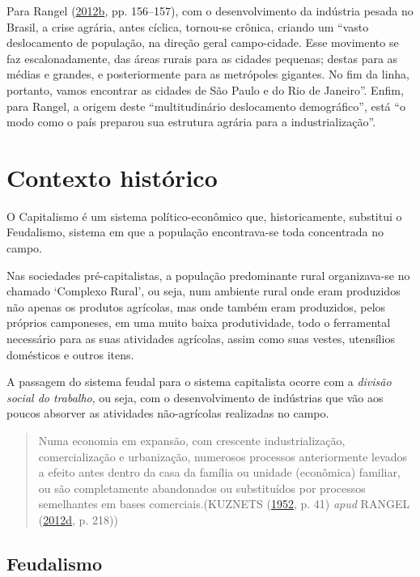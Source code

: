 \documentclass[a4paper, 12pt]{article}
\begin{document}
Para Rangel
(\protect\hyperlink{ref-rangel1988}{2012}\protect\hyperlink{ref-rangel1988}{b},
pp. 156--157), com o desenvolvimento da indústria pesada no Brasil, a
crise agrária, antes cíclica, tornou-se crônica, criando um ``vasto
deslocamento de população, na direção geral campo-cidade. Esse movimento
se faz escalonadamente, das áreas rurais para as cidades pequenas;
destas para as médias e grandes, e posteriormente para as metrópoles
gigantes. No fim da linha, portanto, vamos encontrar as cidades de São
Paulo e do Rio de Janeiro''. Enfim, para Rangel, a origem deste
``multitudinário deslocamento demográfico'', está ``o modo como o país
preparou sua estrutura agrária para a industrialização''.

\hypertarget{contexto-historico}{%
\section{Contexto histórico}\label{contexto-historico}}

O Capitalismo é um sistema político-econômico que, historicamente,
substitui o Feudalismo, sistema em que a população encontrava-se toda
concentrada no campo.

Nas sociedades pré-capitalistas, a população predominante rural
organizava-se no chamado `Complexo Rural', ou seja, num ambiente rural
onde eram produzidos não apenas os produtos agrícolas, mas onde também
eram produzidos, pelos próprios camponeses, em uma muito baixa
produtividade, todo o ferramental necessário para as suas atividades
agrícolas, assim como suas vestes, utensílios domésticos e outros itens.

A passagem do sistema feudal para o sistema capitalista ocorre com a
\emph{divisão social do trabalho}, ou seja, com o desenvolvimento de
indústrias que vão aos poucos absorver as atividades não-agrícolas
realizadas no campo.

\begin{quote}
Numa economia em expansão, com crescente industrialização,
comercialização e urbanização, numerosos processos anteriormente levados
a efeito antes dentro da casa da família ou unidade (econômica)
familiar, ou são completamente abandonados ou substituídos por processos
semelhantes em bases comerciais.(KUZNETS
(\protect\hyperlink{ref-kuznets}{1952}, p. 41) \emph{apud} RANGEL
(\protect\hyperlink{ref-rangel1956}{2012}\protect\hyperlink{ref-rangel1956}{d},
p. 218))
\end{quote}

\hypertarget{feudalismo}{%
\subsection{Feudalismo}\label{feudalismo}}
\end{document}
